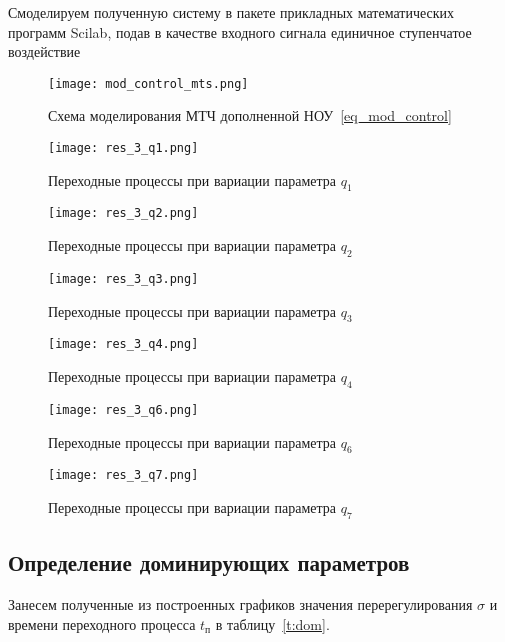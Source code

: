 Смоделируем полученную систему в пакете прикладных математических программ Scilab, подав в качестве входного сигнала единичное ступенчатое воздействие
\begin{figure}
	\centering
	\texttt{[image: mod\_control\_mts.png]}
	\caption{Схема моделирования МТЧ дополненной НОУ~\ref{eq_mod_control}}
	\label{fig:mod_control_mts}
\end{figure}

\begin{figure}
	\centering
	\texttt{[image: res\_3\_q1.png]}
	\caption{Переходные процессы при вариации параметра $q_1$}
	\label{fig:res_3_q1}
\end{figure}

\begin{figure}
	\centering
	\texttt{[image: res\_3\_q2.png]}
	\caption{Переходные процессы при вариации параметра $q_2$}
	\label{fig:res_3_q2}
\end{figure}
\begin{figure}
	\centering
	\texttt{[image: res\_3\_q3.png]}
	\caption{Переходные процессы при вариации параметра $q_3$}
	\label{fig:res_3_q3}
\end{figure}
\begin{figure}
	\centering
	\texttt{[image: res\_3\_q4.png]}
	\caption{Переходные процессы при вариации параметра $q_4$}
	\label{fig:res_3_q4}
\end{figure}
\begin{figure}
	\centering
	\texttt{[image: res\_3\_q6.png]}
	\caption{Переходные процессы при вариации параметра $q_6$}
	\label{fig:res_3_q6}
\end{figure}
\begin{figure}
	\centering
	\texttt{[image: res\_3\_q7.png]}
	\caption{Переходные процессы при вариации параметра $q_7$}
	\label{fig:res_3_q7}
\end{figure}

\newpage
\subsection{Определение доминирующих параметров}

Занесем полученные из построенных графиков значения перерегулирования $\sigma$ и времени переходного процесса  $t_{\text{п}}$ в таблицу~\ref{t:dom}.

